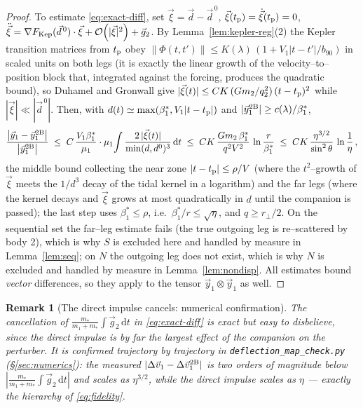 \documentclass[11pt]{article}
\newcommand{\dd}{\mathrm{d}}
\newcommand{\rp}{r_\perp}
\newcommand{\bnt}{b_{90}}
\newcommand{\order}[1]{\mathcal O\!\left(#1\right)}
\newtheorem{remark}{Remark}
\begin{document}
\begin{proof}
To estimate \eqref{eq:exact-diff}, set $\vec\xi=\vec d-\vec d^{\,0}$,
$\vec\xi(t_{\rm p})=\dot{\vec\xi}(t_{\rm p})=0$,
$\ddot{\vec\xi}=\nabla F_{\rm Kep}(\vec d^{\,0})\cdot\vec\xi+\order{|\vec\xi|^2}+\vec g_2$. By
Lemma~\ref{lem:kepler-reg}(2) the Kepler transition matrices from $t_{\rm p}$ obey
$\|\Phi(t,t')\|\le K(\lambda)\,(1+V_1|t-t'|/\bnt)$ in scaled units on both legs (it is exactly the
linear growth of the velocity--to--position block that, integrated against the forcing, produces
the quadratic bound), so Duhamel and Gronwall give
$|\vec\xi(t)|\le CK\,(Gm_2/q_2^2)\,(t-t_{\rm p})^2$ while $|\vec\xi|\ll|\vec d^{\,0}|$. Then, with
$d(t)\simeq\max(\beta_1^*,V_1|t-t_{\rm p}|)$ and
$|\vec y_1^{\rm 2B}|\ge c(\lambda)/\beta_1^*$,
\begin{equation}
  \frac{\big|\vec y_1-\vec y_1^{\rm 2B}\big|}{\big|\vec y_1^{\rm 2B}\big|}
  \;\le\;C\,\frac{V_1\beta_1^*}{\mu_1}\cdot
  \mu_1\!\int\frac{2\,|\vec\xi(t)|}{\min(d,d^0)^3}\,\dd t
  \;\le\;C K\,\frac{Gm_2\,\beta_1^*}{q^2V^2}\,\ln\frac{r}{\beta_1^*}
  \;\le\;CK\,\frac{\eta^{3/2}}{\sin^2\theta}\,\ln\frac1\eta\,,
\end{equation}
the middle bound collecting the near zone $|t-t_{\rm p}|\le\rho/V$ (where the $t^2$--growth of
$\vec\xi$ meets the $1/d^3$ decay of the tidal kernel in a logarithm) and the far legs (where the
kernel decays and $\vec\xi$ grows at most quadratically in $d$ until the companion is passed); the
last step uses $\beta_1^*\le\rho$, i.e.\ $\beta_1^*/r\le\sqrt\eta$, and $q\ge\rp/2$. On the
sequential set the far--leg estimate fails
(the true outgoing leg is re--scattered by body 2), which is why $S$ is excluded here and handled by
measure in Lemma~\ref{lem:seq}; on $N$ the outgoing leg does not exist, which is why $N$ is excluded
and handled by measure in Lemma~\ref{lem:nondisp}. All estimates bound \emph{vector} differences,
so they apply to the tensor $\vec y_1\otimes\vec y_1$ as well.
\end{proof}

\begin{remark}[The direct impulse cancels: numerical confirmation]
\label{rem:cancel}
The cancellation of $\frac{m_*}{m_1+m_*}\int\vec g_2\,\dd t$ in \eqref{eq:exact-diff} is exact but
easy to disbelieve, since the direct impulse is by far the largest effect of the companion on the
\emph{perturber}. It is confirmed trajectory by trajectory in \texttt{deflection\_map\_check.py}
(\S\ref{sec:numerics}): the measured $|\Delta\vec v_1-\Delta\vec v_1^{\rm 2B}|$ is two orders of
magnitude below $|\frac{m_*}{m_1+m_*}\int\vec g_2\,\dd t|$ and scales as $\eta^{3/2}$, while the
direct impulse scales as $\eta$ --- exactly the hierarchy of \eqref{eq:fidelity}.
\end{remark}
\end{document}
